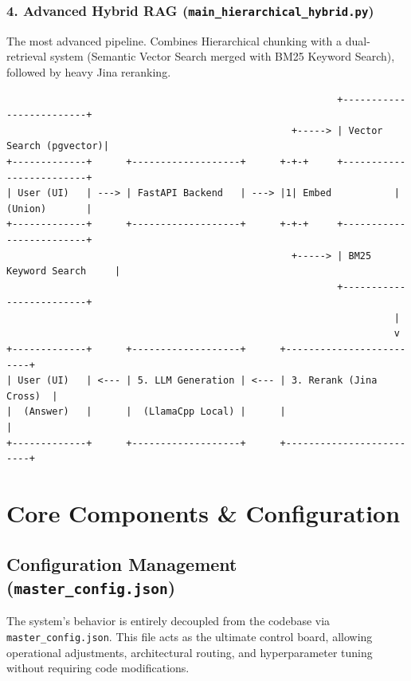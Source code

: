 \documentclass[11pt, a4paper]{article}
\begin{document}
\subsubsection{4. Advanced Hybrid RAG (\texttt{main\_hierarchical\_hybrid.py})}
The most advanced pipeline. Combines Hierarchical chunking with a dual-retrieval system (Semantic Vector Search merged with BM25 Keyword Search), followed by heavy Jina reranking.

\begin{verbatim}
                                                          +-------------------------+
                                                  +-----> | Vector Search (pgvector)|
+-------------+      +-------------------+      +-+-+     +-------------------------+
| User (UI)   | ---> | FastAPI Backend   | ---> |1| Embed           | (Union)       |
+-------------+      +-------------------+      +-+-+     +-------------------------+
                                                  +-----> | BM25 Keyword Search     |
                                                          +-------------------------+
                                                                    |
                                                                    v
+-------------+      +-------------------+      +-------------------------+
| User (UI)   | <--- | 5. LLM Generation | <--- | 3. Rerank (Jina Cross)  |
|  (Answer)   |      |  (LlamaCpp Local) |      |                         |
+-------------+      +-------------------+      +-------------------------+
\end{verbatim}

\section{Core Components \& Configuration}

\subsection{Configuration Management (\texttt{master\_config.json})}
The system's behavior is entirely decoupled from the codebase via \texttt{master\_config.json}. This file acts as the ultimate control board, allowing operational adjustments, architectural routing, and hyperparameter tuning without requiring code modifications.
\end{document}
